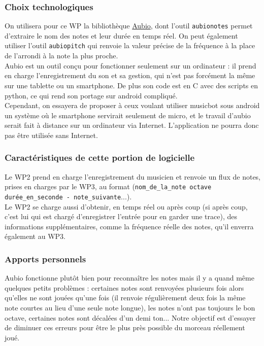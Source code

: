 \documentclass{article}
\begin{document}
\subsubsection{Choix technologiques}
On utilisera pour ce WP la bibliothèque \href{http://aubio.org/}{Aubio}, dont l'outil \texttt{aubionotes} permet d'extraire le nom des notes et leur durée en temps réel. On peut également utiliser l'outil \texttt{aubiopitch} qui renvoie la valeur précise de la fréquence à la place de l'arrondi à la note la plus proche.\\
Aubio est un outil conçu pour fonctionner seulement sur un ordinateur : il prend en charge l'enregistrement du son et sa gestion, qui n'est pas forcément la même sur une tablette ou un smartphone. De plus son code est en C avec des scripts en python, ce qui rend son portage sur android compliqué.\\
Cependant, on essayera de proposer à ceux voulant utiliser musicbot sous android un système où le smartphone servirait seulement de micro, et le travail d'aubio serait fait à distance sur un ordinateur via Internet. L'application ne pourra donc pas être utilisée sans Internet.

\subsubsection{Caractéristiques de cette portion de logicielle}
Le WP2 prend en charge l'enregistrement du musicien et renvoie un flux de notes, prises en charges par le WP3, au format (\texttt{nom\_de\_la\_note octave durée\_en\_seconde - note\_suivante}...).\\
Le WP2 se charge aussi d'obtenir, en temps réel ou après coup (si après coup, c'est lui qui est chargé d'enregistrer l'entrée pour en garder une trace), des informations supplémentaires, comme la fréquence réelle des notes, qu'il enverra également au WP3.
\subsubsection{Apports personnels}
Aubio fonctionne plutôt bien pour reconnaître les notes mais il y a quand même quelques petits problèmes : certaines notes sont renvoyées plusieurs fois alors qu'elles ne sont jouées qu'une fois (il renvoie régulièrement deux fois la même note courtes au lieu d'une seule note longue), les notes n'ont pas toujours le bon octave, certaines notes sont décalées d'un demi ton... Notre objectif est d'essayer de diminuer ces erreurs pour être le plus près possible du morceau réellement joué.
\end{document}
